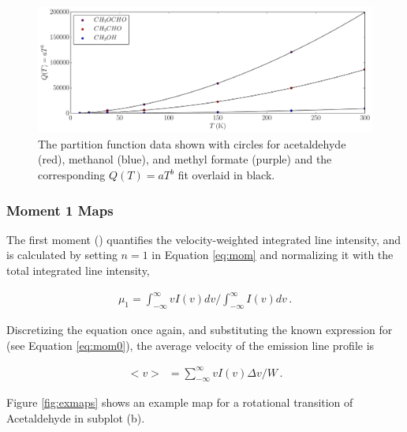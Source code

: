 \documentclass[iop,twocolappendix]{emulateapj}
\begin{document}
\begin{figure}[t]
\begin{center}
\includegraphics[width=13cm]{PartitionFunction.pdf}
\caption{The partition function data shown with circles for acetaldehyde (red), methanol (blue), and methyl formate (purple) and the corresponding $Q(T) = aT^b$ fit overlaid in black.}
\label{fig:partitionfunction}
\end{center}
\end{figure}


\subsubsection{Moment 1 Maps}
\label{subsubsec:mom1}

The first moment (\momone) quantifies the velocity-weighted integrated line intensity, and is calculated by setting $n=1$ in Equation \ref{eq:mom} and normalizing it with the total integrated line intensity,

\begin{align} \label{eq:mom1}
{\mu}_1 = \int_{-\infty}^{\infty} v I(v)dv \Big/ \int_{-\infty}^{\infty} I(v)dv\,.
\end{align}

{\noindent}Discretizing the equation once again, and substituting the known expression for {\momzero} (see Equation \ref{eq:mom0}), the average velocity of the emission line profile is 

\begin{align} \label{eq:avgvel}
<v>{\;}~= \sum_{-\infty}^{\infty} v I(v){\Delta}v \Big/ W\,.
\end{align}

{\noindent}Figure \ref{fig:exmaps} shows an example {\momone} map for a rotational transition of Acetaldehyde in subplot (b). 
\end{document}
